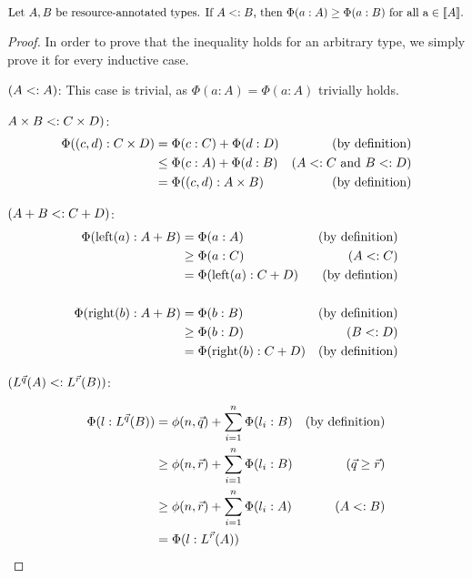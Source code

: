 \begin{lemma}
   \(\text{Let } A, B \text{ be resource-annotated types. If } A <: B \text{, then } \Phi(a : A) \geq \Phi(a : B) \text{ for all a} \in \llbracket A \rrbracket.\)
\end{lemma}

\begin{proof}
   In order to prove that the inequality holds for an arbitrary type, we simply prove it for every inductive case. 

   \((A <: A)\): This case is trivial, as $\Phi(a: A) = \Phi(a : A)$ trivially holds.

   \(A \times B <: C \times D)\): 
   \begin{align*}
      \Phi((c, d) : C \times D) &= \Phi(c : C) + \Phi(d : D)   &\text{(by definition)}\\
				&\leq \Phi(c: A) + \Phi(d : B) &(A <: C \text{ and } B <: D)\\
				&= \Phi((c, d) : A \times B)   &\text{(by definition)}
   \end{align*}

   \((A + B <: C + D)\): 
   \begin{align*}
      \Phi(\text{left}(a) : A + B)  &= \Phi(a : A)		       & \text{(by definition)}\\
				 &\geq \Phi(a: C)	       & (A <: C)\\
				 & = \Phi(\text{left}(a) : C + D) & \text{(by defintion)}\\
				 \\
      \Phi(\text{right}(b) : A + B) &= \Phi(b : B)		       & \text{(by definition)}\\
				 &\geq \Phi(b : D)	       & (B <: D)\\
				 &= \Phi(\text{right}(b) : C + D) & \text{(by definition)}\\
   \end{align*}

   \((L^{\vec{q}}(A) <: L^{\vec{r}}(B))\): 

   \begin{align*}
      \Phi(l : L^{\vec{q}}(B))&= \phi(n, \vec{q}) + \displaystyle\sum_{i = 1}^{n} \Phi(l_i : B)	   & \text{(by definition)}\\
			      &\geq \phi(n, \vec{r}) + \displaystyle\sum_{i = 1}^{n} \Phi(l_i : B) & (\vec{q} \geq \vec{r})  \\
			      &\geq \phi(n, \vec{r}) + \displaystyle\sum_{i = 1}^{n} \Phi(l_i : A) & (A <: B)	   \\
			      &= \Phi(l : L^{\vec{r}}(A))						   & ~~
   \end{align*}
\end{proof}
